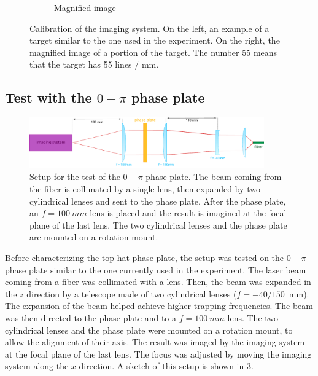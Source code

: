 \begin{figure}
\begin{subfigure}[b]{0.55\textwidth}
        \caption{Magnified image}
        \label{fig:magnified}
    \end{subfigure}
    \hfill
    \caption{Calibration of the imaging system. On the left, an example of a target similar to the one used in the experiment. On the right, the magnified image of a portion of the target. The number 55 means that the target has 55 lines / \si{mm}.}
\end{figure}

\subsection{Test with the $0 - \pi$ phase plate}
\begin{figure}
    \centering
    \includegraphics[width=0.9\textwidth]{chapters/chapter_3/figures/0pi_setup.pdf}
    \caption{Setup for the test of the $0-\pi$ phase plate. The beam coming from the fiber is collimated by a single lens, then expanded by two cylindrical lenses and sent to the phase plate. After the phase plate, an $f=\SI{100}{mm}$ lens is placed and the result is imagined at the focal plane of the last lens. The two cylindrical lenses and the phase plate are mounted on a rotation mount.}
    \label{fig:0pi_setup}
\end{figure}

Before characterizing the top hat phase plate, the setup was tested on the $0-\pi$ phase plate similar to the one currently used in the experiment. The laser beam coming from a fiber was collimated with a lens. Then, the beam was expanded in the $z$ direction by a telescope made of two cylindrical lenses ($f=-40/150$~mm). The expansion of the beam helped achieve higher trapping frequencies. The beam was then directed to the phase plate and to a $f=\SI{100}{mm}$ lens. The two cylindrical lenses and the phase plate were mounted on a rotation mount, to allow the alignment of their axis. The result was imaged by the imaging system at the focal plane of the last lens. The focus was adjusted by moving the imaging system along the $x$ direction. A sketch of this setup is shown in \cref{fig:0pi_setup}.

